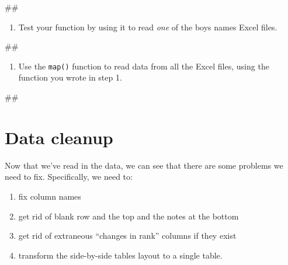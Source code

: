 \documentclass[]{book}
\newenvironment{Shaded}{\begin{snugshade}}{\end{snugshade}}
\newcommand{\NormalTok}[1]{#1}
\providecommand{\tightlist}{%
  \setlength{\itemsep}{0pt}\setlength{\parskip}{0pt}}
\begin{document}
\begin{Shaded}
\begin{Highlighting}[]
\NormalTok{## }
\end{Highlighting}
\end{Shaded}

\begin{enumerate}
\def\labelenumi{\arabic{enumi}.}
\setcounter{enumi}{1}
\tightlist
\item
  Test your function by using it to read \emph{one} of the boys names
  Excel files.
\end{enumerate}

\begin{Shaded}
\begin{Highlighting}[]
\NormalTok{## }
\end{Highlighting}
\end{Shaded}

\begin{enumerate}
\def\labelenumi{\arabic{enumi}.}
\setcounter{enumi}{2}
\tightlist
\item
  Use the \texttt{map()} function to read data from all the Excel files,
  using the function you wrote in step 1.
\end{enumerate}

\begin{Shaded}
\begin{Highlighting}[]
\NormalTok{## }
\end{Highlighting}
\end{Shaded}

\section{Data cleanup}\label{data-cleanup}

Now that we've read in the data, we can see that there are some problems
we need to fix. Specifically, we need to:

\begin{enumerate}
\def\labelenumi{\arabic{enumi}.}
\tightlist
\item
  fix column names
\item
  get rid of blank row and the top and the notes at the bottom
\item
  get rid of extraneous ``changes in rank'' columns if they exist
\item
  transform the side-by-side tables layout to a single table.
\end{enumerate}
\end{document}
